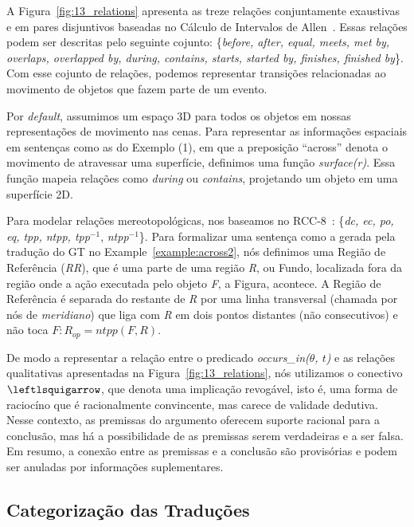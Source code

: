 \documentclass[a4paper, twocolumn, 11pt, twoside]{article}
\begin{document}
A Figura~\ref{fig:13_relations} apresenta  as treze relações conjuntamente exaustivas e em pares disjuntivos baseadas no Cálculo de Intervalos de Allen~\citep{allen1983maintaining}.
Essas relações podem ser descritas pelo seguinte cojunto: \{\textit{before, after, equal, meets, met by, overlaps, overlapped by, during, contains, starts, started by, finishes, finished by}\}. 
Com esse cojunto de relações, podemos representar transições relacionadas ao movimento de objetos que fazem parte de um evento.

Por \textit{default}, assumimos um espaço 3D para todos os objetos em nossas representações de movimento nas cenas. Para representar as informações espaciais em sentenças como as do Exemplo (1), em que a preposição ``across'' denota
o movimento de atravessar uma superfície, definimos uma função \textit{surface(r)}. Essa função mapeia relações como
\textit{during} ou \textit{contains}, projetando um objeto em uma superfície 2D.

Para modelar relações mereotopológicas, nos baseamos no RCC-8~\citep{randell1992spatial}: \{\textit{dc, ec, po, eq, tpp, ntpp, tpp}${^{-1}}$, \textit{ntpp}${^{-1}}$\}.
Para formalizar uma sentença como a gerada pela tradução do GT no Example~\ref{example:across2}, nós definimos uma Região de Referência (\textit{RR}), que é uma parte de 
uma região \textit{R}, ou Fundo, localizada fora da região onde a ação executada pelo objeto \textit{F}, a Figura, 
acontece. A Região de Referência é separada do restante de \textit{R} por uma linha transversal (chamada por nós de \textit{meridiano}) 
que liga com \textit{R} em dois pontos distantes (não consecutivos) e não toca $F: R_{op} = ntpp(F, R)$.

De modo a representar a relação entre o predicado \textit{occurs\_in($\theta$, $t$)} e as relações qualitativas 
apresentadas na Figura~\ref{fig:13_relations}, nós utilizamos o conectivo $\leftlsquigarrow$, que denota uma implicação
revogável, isto é, uma forma de raciocíno que é racionalmente convincente, mas carece de validade dedutiva. 
Nesse contexto, as premissas do argumento oferecem suporte racional para a conclusão, mas há a possibilidade 
de as premissas serem verdadeiras e a ser falsa. Em resumo, a conexão entre as premissas e a conclusão são provisórias
e podem ser anuladas por informações suplementares.  

\subsection{Categorização das Traduções}
\end{document}
